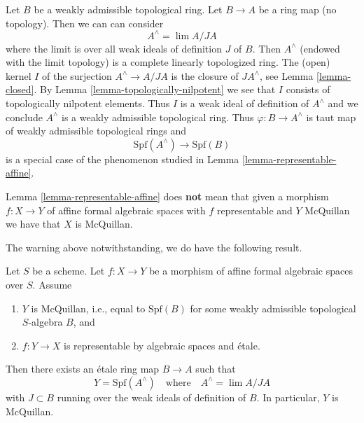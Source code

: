 \begin{example}
\label{example-representable-morphism-from-completion}
Let $B$ be a weakly admissible topological ring. Let $B \to A$ be
a ring map (no topology). Then we can can consider
$$
A^\wedge = \lim A/JA
$$
where the limit is over all weak ideals of definition $J$ of $B$.
Then $A^\wedge$ (endowed with the limit topology) is a
complete linearly topologized ring. The (open) kernel $I$
of the surjection $A^\wedge \to A/JA$ is the closure of $JA^\wedge$, see
Lemma \ref{lemma-closed}. By
Lemma \ref{lemma-topologically-nilpotent}
we see that $I$ consists of topologically nilpotent elements.
Thus $I$ is a weak ideal of definition of $A^\wedge$ and we conclude
$A^\wedge$ is a weakly admissible topological ring. Thus
$\varphi : B \to A^\wedge$ is taut map of weakly admissible
topological rings and
$$
\text{Spf}(A^\wedge) \longrightarrow \text{Spf}(B)
$$
is a special case of the phenomenon studied in
Lemma \ref{lemma-representable-affine}.
\end{example}

\begin{remark}[Warning]
\label{remark-warning}
Lemma \ref{lemma-representable-affine} does {\bf not} mean that given a
morphism $f : X \to Y$ of affine formal algebraic spaces with $f$
representable and $Y$ McQuillan we have that $X$ is McQuillan.
\end{remark}

\noindent
The warning above notwithstanding, we do have the following result.

\begin{lemma}
\label{lemma-etale}
Let $S$ be a scheme. Let $f : X \to Y$ be a morphism of affine formal
algebraic spaces over $S$. Assume
\begin{enumerate}
\item $Y$ is McQuillan, i.e., equal to $\text{Spf}(B)$ for some
weakly admissible topological $S$-algebra $B$, and
\item $f : Y \to X$ is representable by algebraic spaces and \'etale.
\end{enumerate}
Then there exists an \'etale ring map $B \to A$ such that
$$
Y = \text{Spf}(A^\wedge)
\quad\text{where}\quad
A^\wedge = \lim A/JA
$$
with $J \subset B$ running over the weak ideals of definition of $B$.
In particular, $Y$ is McQuillan.
\end{lemma}


